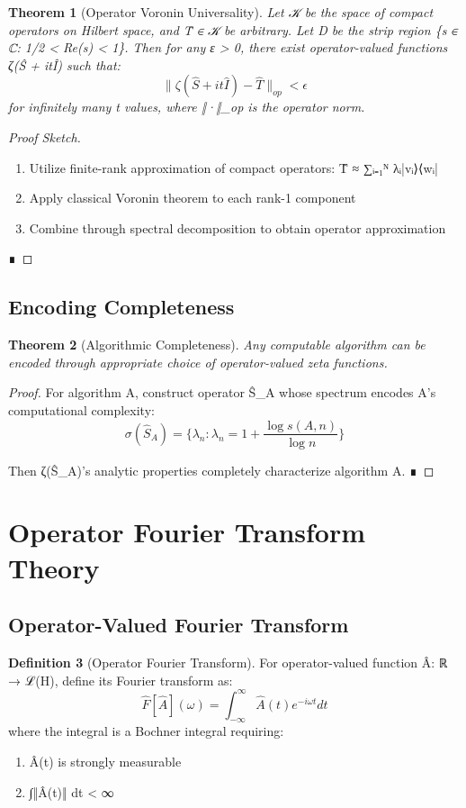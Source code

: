 \documentclass[12pt]{article}
\theoremstyle{plain}
\newtheorem{theorem}{Theorem}[section]
\theoremstyle{definition}
\newtheorem{definition}[theorem]{Definition}
\begin{document}
\begin{theorem}[Operator Voronin Universality]
Let 𝒦 be the space of compact operators on Hilbert space, and T̂ ∈ 𝒦 be arbitrary. Let D be the strip region \{s ∈ ℂ: 1/2 < Re(s) < 1\}. Then for any ε > 0, there exist operator-valued functions ζ(Ŝ + itÎ) such that:
$$\|\zeta(\hat{S} + it\hat{I}) - \hat{T}\|_{op} < \epsilon$$
for infinitely many t values, where ‖·‖_{op} is the operator norm.
\end{theorem}

\begin{proof}[Proof Sketch]
\begin{enumerate}
\item Utilize finite-rank approximation of compact operators: T̂ ≈ ∑ᵢ₌₁ᴺ λᵢ|vᵢ⟩⟨wᵢ|
\item Apply classical Voronin theorem to each rank-1 component
\item Combine through spectral decomposition to obtain operator approximation
\end{enumerate} ∎
\end{proof}

\subsection{Encoding Completeness}

\begin{theorem}[Algorithmic Completeness]
Any computable algorithm can be encoded through appropriate choice of operator-valued zeta functions.
\end{theorem}

\begin{proof}
For algorithm A, construct operator Ŝ_A whose spectrum encodes A's computational complexity:
$$\sigma(\hat{S}_A) = \{\lambda_n: \lambda_n = 1 + \frac{\log s(A,n)}{\log n}\}$$

Then ζ(Ŝ_A)'s analytic properties completely characterize algorithm A. ∎
\end{proof}

\section{Operator Fourier Transform Theory}

\subsection{Operator-Valued Fourier Transform}

\begin{definition}[Operator Fourier Transform]
For operator-valued function Â: ℝ → ℒ(H), define its Fourier transform as:
$$\hat{F}[\hat{A}](\omega) = \int_{-\infty}^{\infty} \hat{A}(t) e^{-i\omega t} dt$$
where the integral is a Bochner integral requiring:
\begin{enumerate}
\item Â(t) is strongly measurable
\item ∫‖Â(t)‖ dt < ∞
\end{enumerate}
\end{definition}
\end{document}
